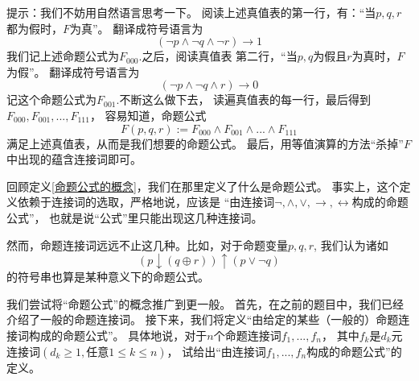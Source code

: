 
提示：我们不妨用自然语言思考一下。
阅读上述真值表的第一行，有：“当$p,q,r$都为假时，$F$为真”。
翻译成符号语言为
$$(\neg p\wedge \neg q\wedge\neg r)\rightarrow 1$$
我们记上述命题公式为$F_{000}$.之后，阅读真值表
第二行，“当$p,q$为假且$r$为真时，$F$为假”。
翻译成符号语言为
$$(\neg p\wedge \neg q\wedge r)\rightarrow 0$$
记这个命题公式为$F_{001}$.不断这么做下去，
读遍真值表的每一行，最后得到$F_{000},F_{001},...,F_{111}$，
容易知道，命题公式
$$F(p,q,r):=F_{000}\wedge F_{001}\wedge...\wedge F_{111}$$
满足上述真值表，从而是我们想要的命题公式。
最后，用等值演算的方法“杀掉”$F$中出现的蕴含连接词即可。\vs

\begin{prob}[关于命题公式]
回顾定义\ref{命题公式的概念}，我们在那里定义了什么是命题公式。
事实上，这个定义依赖于连接词的选取，严格地说，应该是
“由连接词$\neg,\wedge,\vee,
\rightarrow,\leftrightarrow$构成的命题公式”，
也就是说“公式”里只能出现这几种连接词。

然而，命题连接词远远不止这几种。比如，对于命题变量$p,q,r$,
我们认为诸如
$$(p\downarrow(q\oplus r))\uparrow(p\vee\neg q)$$
的符号串也算是某种意义下的命题公式。

我们尝试将“命题公式”的概念推广到更一般。
首先，在之前的题目中，我们已经介绍了一般的命题连接词。
接下来，我们将定义“由给定的某些（一般的）命题连接词构成的命题公式”。
具体地说，对于$n$个命题连接词$f_1,...,f_n$，
其中$f_k$是$d_k$元连接词$(d_k\geq 1,\text{任意}1\leq k\leq n)$，
试给出“由连接词$f_1,...,f_n$构成的命题公式”的定义。
\end{prob}

